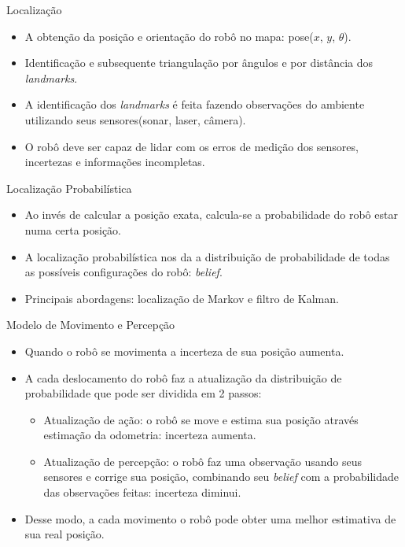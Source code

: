 \documentclass{beamer}
\newlength{\wideitemsep}
\let\olditem\item
\renewcommand{\item}{\setlength{\itemsep}{\wideitemsep}\olditem}
\begin{document}
\begin{frame}{Localização}

 \begin{itemize}
  \item A obtenção da posição e orientação do robô no mapa: pose($x$, $y$, $\theta$).
  
  \item Identificação e subsequente triangulação por ângulos e por distância dos \textit{landmarks}.
  
  \item A identificação dos \textit{landmarks} 
 é feita fazendo observações do ambiente utilizando seus sensores(sonar, laser, câmera).
 
  \item O robô deve ser capaz de lidar com os erros de medição dos sensores, 
 incertezas e informações incompletas.
\end{itemize}
\end{frame}

\begin{frame}{Localização Probabilística}
\begin{itemize}
  \item Ao invés de calcular a posição exata, calcula-se a 
  probabilidade do robô estar numa certa posição.
  \item A localização probabilística nos da a distribuição de probabilidade de todas as possíveis 
 configurações do robô: \textit{belief}.
  \item Principais abordagens: localização de Markov e filtro de Kalman.
\end{itemize}
\end{frame}

\begin{frame}{Modelo de Movimento e Percepção}
\begin{itemize}
\item Quando o robô se movimenta a incerteza de sua posição aumenta. 
\item A cada deslocamento do robô faz a atualização da distribuição de probabilidade que pode ser dividida em 2 passos:
   \begin{itemize}
  \item Atualização de ação: o robô se move e estima sua posição através estimação da odometria: incerteza aumenta.
  \item Atualização de percepção: o robô faz uma observação usando seus sensores e corrige sua posição, 
  combinando seu \textit{belief} com a probabilidade das observações feitas: incerteza diminui.
 \end{itemize}
 
 \item Desse modo, a cada movimento o robô pode obter uma melhor estimativa de sua real posição.
 \end{itemize}
\end{frame}
 
\end{document}
